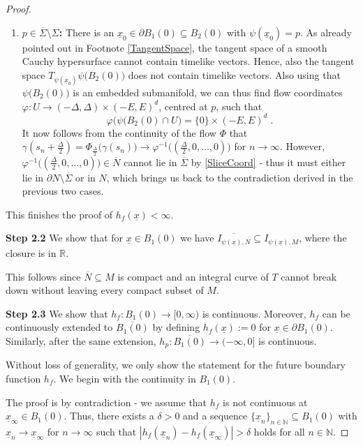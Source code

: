 \documentclass[reqno]{article}
\newcommand{\N}{\mathbb{N}}
\newcommand{\R}{\mathbb{R}}
\newcommand{\ux}{\underline{x}}
\begin{document}
\begin{proof}
\begin{enumerate}
\item \textbf{$p \in \overline{\Sigma} \setminus \Sigma$:} There is an $\ux_0 \in \partial B_1(0) \subseteq B_2(0)$ with $\psi(\ux_0) = p$.  As already pointed out in Footnote \ref{TangentSpace}, the tangent space of a smooth Cauchy hypersurface cannot contain timelike vectors. Hence, also the tangent space $T_{\psi(\ux_0)}\psi\big(B_2(0)\big)$ does not contain timelike vectors. Also using that $\psi\big(B_2(0)\big)$ is an embedded submanifold, we can thus find flow coordinates $\varphi : U \to (-\Delta, \Delta) \times (-E,E)^d$, centred at $p$, such that 
\begin{equation}
\label{SliceCoord}
\varphi\big(\psi(B_2(0) \cap U\big) = \{0\} \times (-E,E)^d\;.
\end{equation}
It now follows from the continuity of the flow $\Phi$ that $\gamma(s_n + \frac{\Delta}{2}) = \Phi_{\frac{\Delta}{2}}\big(\gamma(s_n)\big) \to \varphi^{-1}\big((\frac{\Delta}{2}, 0 , \ldots, 0)\big)$ for $n \to \infty$. However, $\varphi^{-1}\big((\frac{\Delta}{2}, 0 , \ldots, 0)\big) \in \overline{N}$ cannot lie in $\overline{\Sigma}$ by \eqref{SliceCoord} - thus it must either lie in $\partial N \setminus \overline{\Sigma}$ or in $N$, which brings us back to the contradiction derived in the previous two cases.
\end{enumerate}
This finishes the proof of $h_f(\ux) < \infty$.
\vspace*{2mm}


\textbf{Step 2.2} We show that for $\ux \in B_1(0)$ we have $\overline{I_{\psi(\ux),N}} \subseteq I_{\psi(\ux), M}$, where the closure is in $\R$.
\vspace*{2mm}

This follows since $\overline{N} \subseteq M$ is compact and an integral curve of $T$ cannot break down without leaving every compact subset of $M$.
\vspace*{2mm}


\textbf{Step 2.3} We show that $h_f : B_1(0) \to [0,\infty)$ is continuous. Moreover, $h_f$ can be continuously extended to $\overline{B_1(0)}$ by defining $h_f(\ux) := 0$ for $\ux \in \partial B_1(0)$. Similarly, after the same extension, $h_p : \overline{B_1(0)} \to (-\infty,0]$ is continuous.
\vspace*{2mm}

Without loss of generality, we only show the statement for the future boundary function $h_f$. We begin with the continuity in $B_1(0)$.

The proof is by contradiction - we assume that $h_f$ is not continuous at $\ux_\infty \in B_1(0)$. Thus, there exists a $\delta >0$ and a sequence $\{\ux_n\}_{n \in \N} \subseteq B_1(0)$ with $\ux_n \to \ux_\infty$ for $n \to \infty$ such that $|h_f(\ux_n) - h_f(\ux_\infty)| > \delta$ holds for all $n \in \N$. 


\end{proof}
\end{document}
